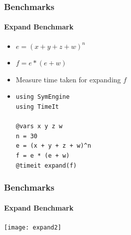 \documentclass{beamer}
\begin{document}





\begin{frame}[fragile]
\frametitle{Benchmarks}
\framesubtitle{Expand Benchmark}
\begin{itemize}
\item $ e = (x + y + z + w) ^ n $
\item $ f = e * (e + w) $
\item Measure time taken for expanding $f$
\linebreak
\item
\begin{verbatim}
using SymEngine
using TimeIt

@vars x y z w
n = 30
e = (x + y + z + w)^n
f = e * (e + w)
@timeit expand(f)
\end{verbatim}

\end{itemize}
\end{frame}


\begin{frame}
\frametitle{Benchmarks}
\framesubtitle{Expand Benchmark}
\texttt{[image: expand2]}
\end{frame}


\end{document}
